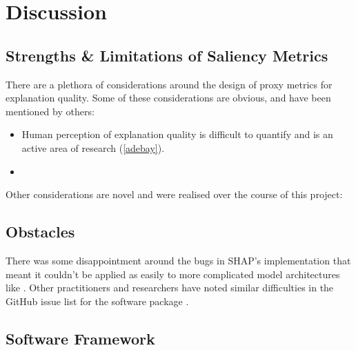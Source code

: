 \documentclass[main]{subfiles}
\begin{document}
\chapter{Discussion}

\section{Strengths \& Limitations of Saliency Metrics}

There are a plethora of considerations around the design of proxy metrics for explanation quality. Some of these considerations are obvious, and have been mentioned by others:
\begin{itemize}
\item Human perception of explanation quality is difficult to quantify and is an active area of research (\ref{adebay}).
\item 
\end{itemize}


Other considerations are novel and were realised over the course of this project:








\section{Obstacles}

There was some disappointment around the bugs in SHAP's implementation that meant it couldn't be applied as easily to more complicated model architectures like . Other practitioners and researchers have noted similar difficulties in the GitHub issue list for the software package \cite{shaprepo}.


\section{Software Framework}




\end{document}
